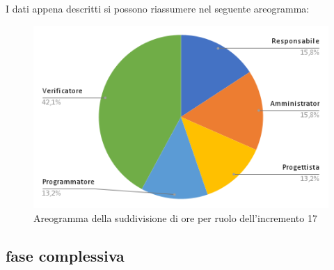 \pagebreak
I dati appena descritti si possono riassumere nel seguente areogramma:
\begin{figure}[!h]
    \vspace{5px}
    \includegraphics[scale=0.5]{../../../Images/Diagrammi/Diagramma a torta/areogrammaIncremento17.png}
    \centering
    \caption{Areogramma della suddivisione di ore per ruolo dell'incremento 17}
\end{figure}

\subsection{fase complessiva}
